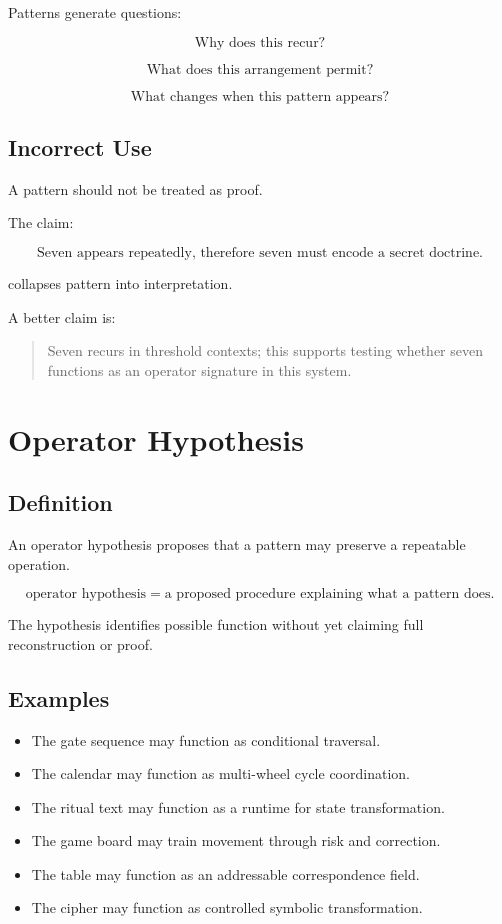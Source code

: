 \documentclass[11pt]{book}
\begin{document}
Patterns generate questions:

\[
\text{Why does this recur?}
\]

\[
\text{What does this arrangement permit?}
\]

\[
\text{What changes when this pattern appears?}
\]

\subsection{Incorrect Use}

A pattern should not be treated as proof.

The claim:

\[
\text{Seven appears repeatedly, therefore seven must encode a secret doctrine.}
\]

collapses pattern into interpretation.

A better claim is:

\begin{quote}
Seven recurs in threshold contexts; this supports testing whether seven functions as an operator signature in this system.
\end{quote}

\section{Operator Hypothesis}

\subsection{Definition}

An operator hypothesis proposes that a pattern may preserve a repeatable operation.

\[
\text{operator hypothesis} = \text{a proposed procedure explaining what a pattern does}.
\]

The hypothesis identifies possible function without yet claiming full reconstruction or proof.

\subsection{Examples}

\begin{itemize}
    \item The gate sequence may function as conditional traversal.
    \item The calendar may function as multi-wheel cycle coordination.
    \item The ritual text may function as a runtime for state transformation.
    \item The game board may train movement through risk and correction.
    \item The table may function as an addressable correspondence field.
    \item The cipher may function as controlled symbolic transformation.
\end{itemize}
\end{document}
